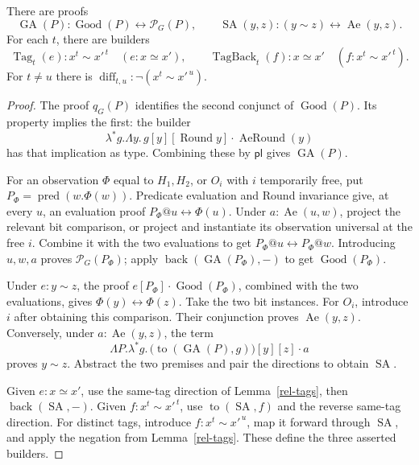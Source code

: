 \begin{lemma}
\label{rel-observation-equivalence}
There are proofs
\[
 \operatorname{GA}(P):
       \operatorname{Good}(P)\leftrightarrow\mathcal P_G(P),
 \qquad
 \operatorname{SA}(y,z):
       (y\sim z)\leftrightarrow\operatorname{Ae}(y,z).
\]
For each \(t\), there are builders
\[
 \operatorname{Tag}_t(e):x^t\sim x'^{\,t}
                  \quad(e:x\simeq x'),\qquad
 \operatorname{TagBack}_t(f):x\simeq x'
                  \quad(f:x^t\sim x'^{\,t}).
\]
For \(t\ne u\) there is
\(\operatorname{diff}_{t,u}:\neg(x^t\sim x'^{\,u})\).
\end{lemma}
\begin{proof}
The proof \(q_G(P)\) identifies the second conjunct of
\(\operatorname{Good}(P)\).  Its property implies the first:
the builder
\[
 \lambda^*g.\Lambda y.\,
      g[y][\operatorname{Round}y]\cdot\operatorname{AeRound}(y)
\]
has that implication as type.  Combining these by
\(\mathsf{pl}\) gives \(\operatorname{GA}(P)\).

For an observation \(\Phi\) equal to \(H_1,H_2\), or \(O_i\)
with \(i\) temporarily free, put
\(P_\Phi=\operatorname{pred}(w.\Phi(w))\).
Predicate evaluation and Round invariance give, at every \(u\),
an evaluation proof \(P_\Phi@u\leftrightarrow\Phi(u)\).
Under \(a:\operatorname{Ae}(u,w)\), project the relevant bit
comparison, or project and instantiate its observation
universal at the free \(i\).  Combine it with the two evaluations
to get \(P_\Phi@u\leftrightarrow P_\Phi@w\).
Introducing \(u,w,a\) proves \(\mathcal P_G(P_\Phi)\);
apply \(\operatorname{back}(\operatorname{GA}(P_\Phi),-)\)
to get \(\operatorname{Good}(P_\Phi)\).

Under \(e:y\sim z\), the proof
\(e[P_\Phi]\cdot\operatorname{Good}(P_\Phi)\), combined
with the two evaluations, gives \(\Phi(y)\leftrightarrow\Phi(z)\).
Take the two bit instances.  For \(O_i\), introduce \(i\)
after obtaining this comparison.  Their conjunction proves
\(\operatorname{Ae}(y,z)\).  Conversely, under
\(a:\operatorname{Ae}(y,z)\), the term
\[
 \Lambda P.\lambda^*g.\,
       \bigl(\operatorname{to}(\operatorname{GA}(P),g)\bigr)
                       [y][z]\cdot a
\]
proves \(y\sim z\).  Abstract the two premises and pair the
directions to obtain \(\operatorname{SA}\).

Given \(e:x\simeq x'\), use the same-tag direction of
Lemma~\ref{rel-tags}, then \(\operatorname{back}(\operatorname{SA},-)\).
Given \(f:x^t\sim x'^{\,t}\), use
\(\operatorname{to}(\operatorname{SA},f)\) and the reverse
same-tag direction.  For distinct tags, introduce
\(f:x^t\sim x'^{\,u}\), map it forward through
\(\operatorname{SA}\), and apply the negation from
Lemma~\ref{rel-tags}.  These define the three asserted builders.
\end{proof}

